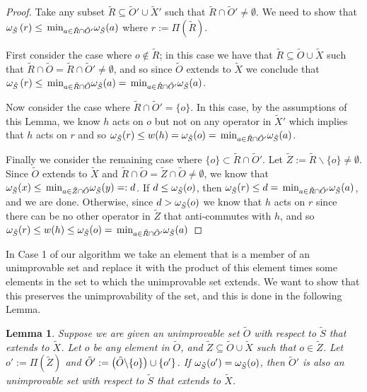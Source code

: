 \documentclass[twocolumn,showpacs,preprintnumbers,amsmath,amssymb,nofootinbib,pra,floatfix]{revtex4-1}
\newtheorem{lemma}{Lemma}
\newenvironment{remark}[1][Remark]{\begin{trivlist}
\item[\hskip \labelsep {\bfseries #1}]}{\end{trivlist}}
\newcommand{\set}{\tilde}
\begin{document}
\begin{proof}
Take any subset $\set R\subseteq \set O'\cup\set X'$ such that $\set R\cap\set O'\ne\emptyset$.  We need to show that $\om_{\set S}\paren{r} \le \min_{a\in\set R\cap\set O'}\om_{\set S}(a)$ where $r:=\Pi(\set R)$.

First consider the case where $o\notin \set R$;  in this case we have that $\set R\subseteq \set O\cup\set X$ such that $\set R\cap\set O=\set R\cap\set O'\ne\emptyset$, and so since $\set O$ extends to $\set X$ we conclude that $\om_{\set S}\paren{r} \le \min_{a\in\set R\cap\set O}\om_{\set S}(a)= \min_{a\in\set R\cap\set O'}\om_{\set S}(a)$.

Now consider the case where $\set R\cap\set O'=\{o\}$.  In this case, by the assumptions of this Lemma, we know $h$ acts on $o$ but not on any operator in $\set X'$ which implies that $h$ acts on $r$ and so $\om_{\set S}(r) \le w(h)=\om_{\set S}(o)=\min_{a\in\set R\cap\set O'}\om_{\set S}(a)$.

Finally we consider the remaining case where $\{o\}\subset\set R\cap\set O'$. Let $\set Z := \set R\backslash\{o\}\ne\emptyset$.  Since $\set O$ extends to $\set X$ and $\set R\cap\set O=\set Z\cap\set O\ne\emptyset$, we know that $\om_{\set S}(x)\le \min_{a\in\set Z\cap\set O}\om_{\set S}(y)=:d$.  If $d \le \om_{\set S}(o)$, then $\om_{\set S}(r)\le d = \min_{a\in\set R\cap\set O'}\om_{\set S}(a)$, and we are done.  Otherwise, since $d> \om_{\set S}(o)$ we know that $h$ acts on $r$ since there can be no other operator in $\set Z$ that anti-commutes with $h$, and so $\om_{\set S}(r) \le w(h)\le\om_{\set S}(o)=\min_{a\in\set R\cap\set O'}\om_{\set S}(a)$
\end{proof}
\begin{remark}
In Case 1 of our algorithm we take an element that is a member of an unimprovable set and replace it with the product of this element times some elements in the set to which the unimprovable set extends.  We want to show that this preserves the unimprovability of the set, and this is done in the following Lemma.
\end{remark}

\begin{lemma}
\label{lemma:replacing element with product preserves unimprovability}
Suppose we are given an unimprovable set $\set O$ with respect to $\set S$ that extends to $\set X$.  Let $o$ be any element in $\set O$, and $\set Z\subseteq \set O\cup\set X$ such that $o\in \set Z$.  Let $o':=\Pi(\set Z)$ and $\set O' := \paren{\set O\backslash\{o\}}\cup\{o'\}$.  If $\om_{\set S}(o')=\om_{\set S}(o)$, then $\set O'$ is also an unimprovable set with respect to $\set S$ that extends to $\set X$.
\end{lemma}
\end{document}
